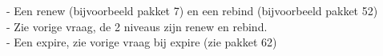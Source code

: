 - Een renew (bijvoorbeeld pakket 7) en een rebind (bijvoorbeeld pakket 52)\\
- Zie vorige vraag, de 2 niveaus zijn renew en rebind.\\
- Een expire, zie vorige vraag bij expire (zie pakket 62)